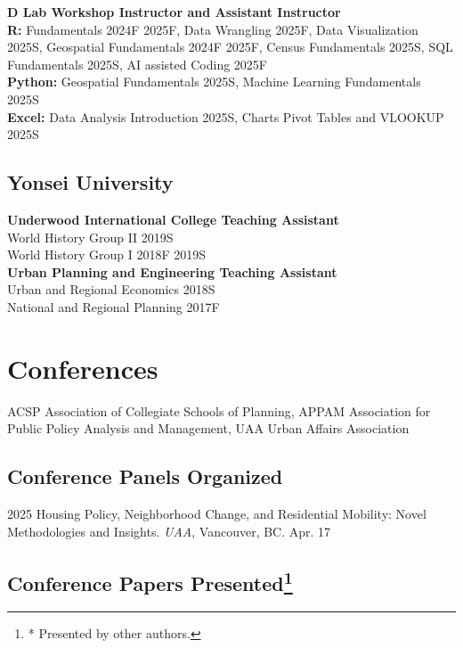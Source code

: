 \documentclass[10pt,letterpaper]{article}
\begin{document}
\textbf{D Lab  Workshop Instructor and Assistant Instructor}\\[0.3em]
\textbf{R:} Fundamentals 2024F 2025F, Data Wrangling 2025F, Data Visualization 2025S, Geospatial Fundamentals 2024F 2025F, Census Fundamentals 2025S, SQL Fundamentals 2025S, AI assisted Coding 2025F\\[0.3em]
\textbf{Python:} Geospatial Fundamentals 2025S, Machine Learning Fundamentals 2025S\\[0.3em]
\textbf{Excel:} Data Analysis Introduction 2025S, Charts Pivot Tables and VLOOKUP 2025S

\subsection{Yonsei University}
\textbf{Underwood International College  Teaching Assistant}\\[0.3em]
World History Group II 2019S\\
World History Group I 2018F 2019S\\[0.6em]
\textbf{Urban Planning and Engineering  Teaching Assistant}\\[0.3em]
Urban and Regional Economics 2018S\\
National and Regional Planning 2017F

\section{Conferences}

ACSP Association of Collegiate Schools of Planning, APPAM Association for Public Policy Analysis and Management, UAA Urban Affairs Association

\subsection{Conference Panels Organized}
\begin{tablist}
  \item[2025] \tab{}Housing Policy, Neighborhood Change, and Residential Mobility: Novel Methodologies and Insights. \emph{UAA}, Vancouver, BC. Apr. 17
\end{tablist}

\subsection{Conference Papers Presented\footnote{* Presented by other authors.}}
\end{document}
